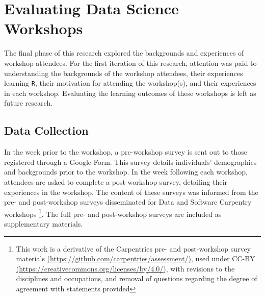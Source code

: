 \documentclass[12pt]{article}
\begin{document}


\section{Evaluating Data Science Workshops}
\label{sec:implement}

\quad The final phase of this research explored the backgrounds and experiences
of workshop attendees. For the first iteration of this research, attention was
paid to understanding the backgrounds of the workshop attendees, their
experiences learning \texttt{R}, their motivation for attending the workshop(s),
and their experiences in each workshop. Evaluating the learning outcomes of
these workshops is left as future research.  

\subsection{Data Collection}

\quad  In the week prior to the workshop, a pre-workshop survey is sent out to
those registered through a Google Form. This survey details individuals' 
demographics and backgrounds prior to the workshop. In the week following each
workshop, attendees are asked to complete a post-workshop survey, detailing
their experiences in the workshop. The content of these surveys was informed
from the pre- and post-workshop surveys disseminated for Data and Software 
Carpentry workshops \footnote{This work is a derivative of the Carpentries pre-
and post-workshop survey materials \href{https://github.com/carpentries/assessment/}{(https://github.com/carpentries/assessment/)}, used under CC-BY \href{https://creativecommons.org/licenses/by/4.0/}{(https://creativecommons.org/licenses/by/4.0/)}, with revisions to the disciplines and occupations, and
removal of questions regarding the degree of agreement with statements provided}.
The full pre- and post-workshop surveys are included as supplementary materials.
\end{document}
